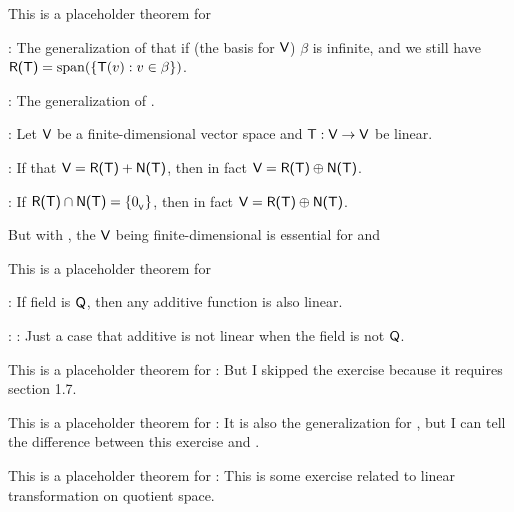 \begin{additional theorem} \label{athm 2.10}
This is a placeholder theorem for

 : The generalization of  that if (the basis for \(\textsf{V}\)) \(\beta\) is infinite, and we still have \(\textsf{R(T)} = \operatorname{span}(\{ \textsf{T}(v) : v \in \beta \})\).

 : The generalization of .
\end{additional theorem}

\begin{additional theorem} \label{athm 2.11}

:
Let \(\textsf{V}\) be a finite-dimensional vector space and \(\textsf{T} : \textsf{V} \to \textsf{V}\) be linear.

: If that \(\textsf{V} = \textsf{R(T)} + \textsf{N(T)}\), then in fact
\(\textsf{V} = \textsf{R(T)} \oplus \textsf{N(T)}\).

: If \(\textsf{R(T)} \cap \textsf{N(T)} = \{ 0_{_{\textsf{V}}} \}\), then in fact \(\textsf{V} = \textsf{R(T)} \oplus \textsf{N(T)}\).

 But with , the \(\textsf{V}\) being finite-dimensional is essential for  and 
\end{additional theorem}

\begin{additional theorem} \label{athm 2.12}
This is a placeholder theorem for

 : If field is \(\textsf{Q}\), then any additive function is also linear.

: : Just a case that additive is not linear when the field is not \(\textsf{Q}\).
\end{additional theorem}

\begin{additional theorem} \label{athm 2.13}
This is a placeholder theorem for :
But I skipped the exercise because it requires section 1.7.
\end{additional theorem}

\begin{additional theorem} \label{athm 2.14}
This is a placeholder theorem for :
It is also the generalization for , but I can tell the difference between this exercise and .
\end{additional theorem}

\begin{additional theorem} \label{athm 2.15}
This is a placeholder theorem for :
This is some exercise related to linear transformation on quotient space.
\end{additional theorem}
